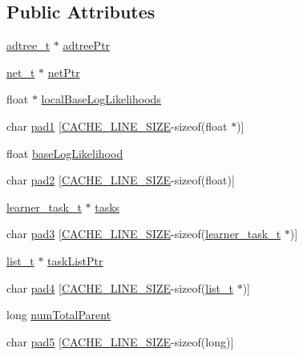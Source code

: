 \subsection*{Public Attributes}
\begin{DoxyCompactItemize}
\item 
\hyperlink{adtree_8h_a2cef7aefcfb5056b04dc3dc5640243ed}{adtree\-\_\-t} $\ast$ \hyperlink{structlearner_ac3fb6f6577f48c8f03e357076d2c6352}{adtree\-Ptr}
\item 
\hyperlink{net_8h_a418dbad92573b09dbdf0db1582d7148e}{net\-\_\-t} $\ast$ \hyperlink{structlearner_a75d4f2037304caa4f98b539c20e81b68}{net\-Ptr}
\item 
float $\ast$ \hyperlink{structlearner_ad323bbf73e81ed9f2c7c812ec450b525}{local\-Base\-Log\-Likelihoods}
\item 
char \hyperlink{structlearner_ade90eb31b279e01ad5939f4f22552aed}{pad1} \mbox{[}\hyperlink{grid_8c_ab711bbb41cecee65bf4515d78f323628}{C\-A\-C\-H\-E\-\_\-\-L\-I\-N\-E\-\_\-\-S\-I\-Z\-E}-\/sizeof(float $\ast$)\mbox{]}
\item 
float \hyperlink{structlearner_ab7b9ab0797cf71d2d1f68f688352ec6a}{base\-Log\-Likelihood}
\item 
char \hyperlink{structlearner_ad2de1f68bad84f37251028219aa2e1c7}{pad2} \mbox{[}\hyperlink{grid_8c_ab711bbb41cecee65bf4515d78f323628}{C\-A\-C\-H\-E\-\_\-\-L\-I\-N\-E\-\_\-\-S\-I\-Z\-E}-\/sizeof(float)\mbox{]}
\item 
\hyperlink{learner_8h_a388a4b573490ce9e0436ce81867cbd38}{learner\-\_\-task\-\_\-t} $\ast$ \hyperlink{structlearner_ae671bea416918ec6c31c076caa2425b5}{tasks}
\item 
char \hyperlink{structlearner_a7da8752af7cb1db03c0b80b1604dc6d0}{pad3} \mbox{[}\hyperlink{grid_8c_ab711bbb41cecee65bf4515d78f323628}{C\-A\-C\-H\-E\-\_\-\-L\-I\-N\-E\-\_\-\-S\-I\-Z\-E}-\/sizeof(\hyperlink{learner_8h_a388a4b573490ce9e0436ce81867cbd38}{learner\-\_\-task\-\_\-t} $\ast$)\mbox{]}
\item 
\hyperlink{list_8h_af629e6a6713d7de11eab50cbe6449b06}{list\-\_\-t} $\ast$ \hyperlink{structlearner_a1ed62740e14c9ecc3053cf2db0add5e0}{task\-List\-Ptr}
\item 
char \hyperlink{structlearner_a85d63103208ae74ef5629b66743a4e8c}{pad4} \mbox{[}\hyperlink{grid_8c_ab711bbb41cecee65bf4515d78f323628}{C\-A\-C\-H\-E\-\_\-\-L\-I\-N\-E\-\_\-\-S\-I\-Z\-E}-\/sizeof(\hyperlink{list_8h_af629e6a6713d7de11eab50cbe6449b06}{list\-\_\-t} $\ast$)\mbox{]}
\item 
long \hyperlink{structlearner_aeea31e3e22fa08732680820514a7d3fd}{num\-Total\-Parent}
\item 
char \hyperlink{structlearner_a662001f67ea04c80b5759a82ed086421}{pad5} \mbox{[}\hyperlink{grid_8c_ab711bbb41cecee65bf4515d78f323628}{C\-A\-C\-H\-E\-\_\-\-L\-I\-N\-E\-\_\-\-S\-I\-Z\-E}-\/sizeof(long)\mbox{]}
\end{DoxyCompactItemize}


